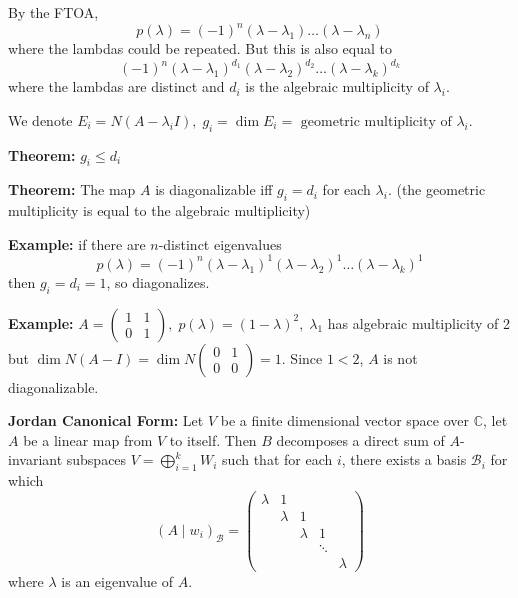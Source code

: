 \documentclass[12pt]{article}
\newcommand{\C}{\mathbb{C}}
\begin{document}
    By the FTOA, 
    \[p(\lambda) = (-1)^n (\lambda - \lambda_1)\dots(\lambda - \lambda_n)\]
    where the lambdas could be repeated. But this is also equal to 
    \[(-1)^n (\lambda - \lambda_1)^{d_1} (\lambda - \lambda_2)^{d_2} \dots (\lambda 
    - \lambda_k)^{d_k}\]
    where the lambdas are distinct and $d_i$ is the algebraic multiplicity of $\lambda_i$. 

    We denote $E_i = N(A - \lambda_i I), \; g_i = \dim E_i = \text{ geometric multiplicity of } \lambda_i$.

    \textbf{Theorem:} $g_i \leq d_i$

    \textbf{Theorem:} The map $A$ is diagonalizable iff $g_i = d_i$ for each $\lambda_i$. (the geometric multiplicity is equal to the algebraic multiplicity)

    \textbf{Example:} if there are $n$-distinct eigenvalues 
    \[p(\lambda) = (-1)^n (\lambda - \lambda_1)^1 (\lambda - \lambda_2)^1 \dots (\lambda - \lambda_k)^1\] 
    then $g_i = d_i = 1$, so diagonalizes. 
    
    \textbf{Example:} $A = \begin{pmatrix}
        1 & 1\\ 
        0 & 1
    \end{pmatrix}, \; p(\lambda) = (1 -\lambda)^2, \; \lambda_1$ has algebraic multiplicity of 2 but $\dim N(A - I) = \dim N\begin{pmatrix}
        0 & 1\\
        0 & 0
    \end{pmatrix} = 1$. Since $1 < 2$, $A$ is not diagonalizable. 

    \textbf{Jordan Canonical Form:} Let $V$ be a finite dimensional vector space over $\C$, let $A$ be a linear map from $V$ to itself. Then $B$ decomposes a direct sum of $A$-invariant subspaces $V = \bigoplus_{i=1}^k W_i$ such that for each $i$, there exists a basis $\mathcal{B}_i$ for which 
    \[(A \mid w_i)_{\mathcal{B}} = \begin{pmatrix}
        \lambda & 1\\ 
        & \lambda & 1\\ 
        & & \lambda & 1\\ 
        & & & \ddots\\ 
        & & & & \lambda
    \end{pmatrix}\]  
    where $\lambda$ is an eigenvalue of $A$. 
\end{document}
